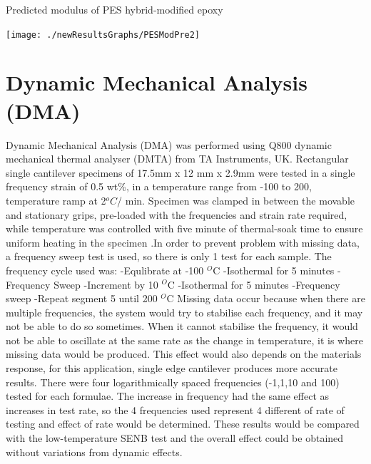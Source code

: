 \documentclass[numbers=noendperiod,chapterprefix=on]{icldt} %
\begin{document}
{\begin{table}[!htpb]
\centering
\caption{Predicted modulus of PES hybrid-modified epoxy} %
\texttt{[image: ./newResultsGraphs/PESModPre2]}\label{PESModPre2}
\end{table}
\FloatBarrier

\section{Dynamic Mechanical Analysis (DMA)}
Dynamic Mechanical Analysis (DMA) was performed using Q800 dynamic mechanical thermal analyser (DMTA) from TA Instruments, UK. Rectangular single cantilever specimens of 17.5mm x 12 mm x 2.9mm were tested in a single frequency strain of 0.5 wt\%, in a temperature range from -100 to 200, temperature ramp at 2$^oC$/ min. Specimen was clamped in between the movable and stationary grips, pre-loaded with the frequencies and strain rate required, while temperature was controlled with five minute of thermal-soak time to ensure uniform heating in the specimen \cite{D50232007}.In order to prevent problem with missing data, a frequency sweep test is used, so there is only 1 test for each sample.
The frequency cycle used was:\newline
-Equlibrate at -100 $^O$C
-Isothermal for 5 minutes\newline
-Frequency Sweep\newline
-Increment by 10 $^O$C\newline
-Isothermal for 5 minutes\newline
-Frequency sweep\newline
-Repeat segment 5 until 200 $^O$C
\newline
 Missing data occur because when there are multiple frequencies, the system would try to stabilise each frequency, and it may not be able to do so sometimes. When it cannot stabilise the frequency, it would not be able to oscillate at the same rate as the change in temperature, it is where missing data would be produced. This effect would also depends on the materials response, for this application, single edge cantilever produces more accurate results.
There were four logarithmically spaced frequencies (-1,1,10 and 100) tested for each formulae. The increase in frequency had the same effect as increases in test rate, so the 4 frequencies used represent 4 different of rate of testing and effect of rate would be determined. These results would be compared with the low-temperature SENB test and the overall effect could be obtained without variations from dynamic effects.
}
\end{document}
